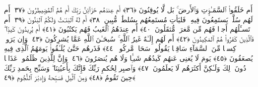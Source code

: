  أَم خَلَقُوا۟ ٱلسَّمَـٰوَٟتِ وَٱلأَرضَ ۚ بَل لَّا يُوقِنُونَ ﴿٣٦﴾
 أَم عِندَهُم خَزَآئِنُ رَبِّكَ أَم هُمُ ٱلمُصَۣيطِرُونَ ﴿٣٧﴾
 أَم لَهُم سُلَّمٌۭ يَستَمِعُونَ فِيهِ ۖ فَليَأتِ مُستَمِعُهُم بِسُلطَٰنٍۢ مُّبِينٍ ﴿٣٨﴾
 أَم لَهُ ٱلبَنَـٰتُ وَلَكُمُ ٱلبَنُونَ ﴿٣٩﴾
 أَم تَسـَٔلُهُم أَجرًۭا فَهُم مِّن مَّغرَمٍۢ مُّثقَلُونَ ﴿٤٠﴾
 أَم عِندَهُمُ ٱلغَيبُ فَهُم يَكتُبُونَ ﴿٤١﴾
 أَم يُرِيدُونَ كَيدًۭا ۖ فَٱلَّذِينَ كَفَرُوا۟ هُمُ ٱلمَكِيدُونَ ﴿٤٢﴾
 أَم لَهُم إِلَـٰهٌ غَيرُ ٱللَّهِ ۚ سُبحَـٰنَ ٱللَّهِ عَمَّا يُشرِكُونَ ﴿٤٣﴾
 وَإِن يَرَوا۟ كِسفًۭا مِّنَ ٱلسَّمَآءِ سَاقِطًۭا يَقُولُوا۟ سَحَابٌۭ مَّركُومٌۭ ﴿٤٤﴾
 فَذَرهُم حَتَّىٰ يُلَـٰقُوا۟ يَومَهُمُ ٱلَّذِى فِيهِ يُصعَقُونَ ﴿٤٥﴾
 يَومَ لَا يُغنِى عَنهُم كَيدُهُم شَيـًۭٔا وَلَا هُم يُنصَرُونَ ﴿٤٦﴾
 وَإِنَّ لِلَّذِينَ ظَلَمُوا۟ عَذَابًۭا دُونَ ذَٟلِكَ وَلَـٰكِنَّ أَكثَرَهُم لَا يَعلَمُونَ ﴿٤٧﴾
 وَٱصبِر لِحُكمِ رَبِّكَ فَإِنَّكَ بِأَعيُنِنَا ۖ وَسَبِّح بِحَمدِ رَبِّكَ حِينَ تَقُومُ ﴿٤٨﴾
 وَمِنَ ٱلَّيلِ فَسَبِّحهُ وَإِدبَٰرَ ٱلنُّجُومِ ﴿٤٩﴾
 
